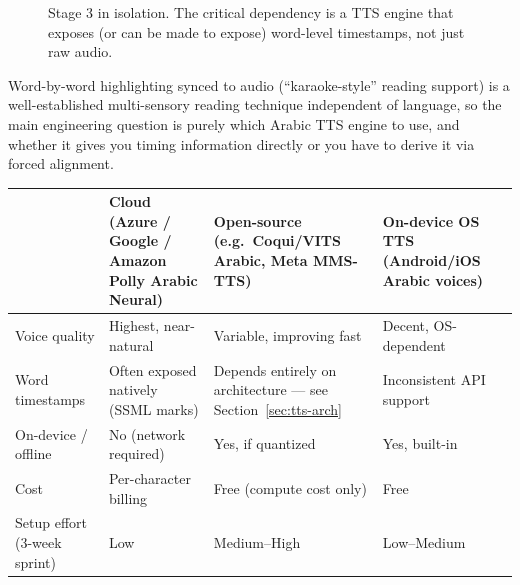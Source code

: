 \documentclass[11pt,a4paper]{article}
\begin{document}
\begin{figure}[h!]
\centering
{}
\caption{Stage 3 in isolation. The critical dependency is a TTS engine that
exposes (or can be made to expose) word-level timestamps, not just raw audio.}
\label{fig:stage3}
\end{figure}

Word-by-word highlighting synced to audio (``karaoke-style'' reading support) is a
well-established multi-sensory reading technique independent of language, so the
main engineering question is purely which Arabic TTS engine to use, and whether it
gives you timing information directly or you have to derive it via forced alignment.

\begin{center}
\small
\begin{tabular}{@{}p{3.2cm}p{3.5cm}p{3.5cm}p{3.5cm}@{}}
\toprule
& \textbf{Cloud (Azure / Google / Amazon Polly Arabic Neural)} &
\textbf{Open-source (e.g.\ Coqui/VITS Arabic, Meta MMS-TTS)} &
\textbf{On-device OS TTS (Android/iOS Arabic voices)} \\
\midrule
Voice quality & Highest, near-natural & Variable, improving fast & Decent, OS-dependent \\
Word timestamps & Often exposed natively (SSML marks) & Depends entirely on architecture --- see Section~\ref{sec:tts-arch} & Inconsistent API support \\
On-device / offline & No (network required) & Yes, if quantized & Yes, built-in \\
Cost & Per-character billing & Free (compute cost only) & Free \\
Setup effort (3-week sprint) & Low & Medium--High & Low--Medium \\
\bottomrule
\end{tabular}
\end{center}
\end{document}
